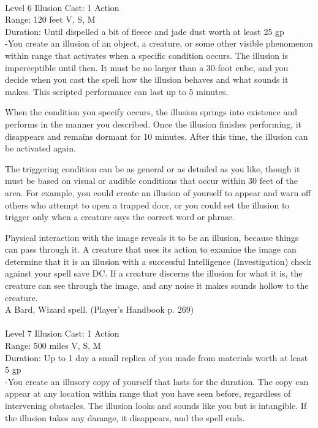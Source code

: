 \documentclass[10pt,twocolumn]{report}
\begin{document}
 \\
Level 6 \quad Illusion \quad Cast: 1 Action\\
Range: 120 feet \quad V, S, M\\
Duration: Until dispelled \quad a bit of fleece and jade dust worth at least 25 gp\\
-You create an illusion of an object, a creature, or some other visible phenomenon within range that activates when a specific condition occurs. The illusion is imperceptible until then. It must be no larger than a 30-foot cube, and you decide when you cast the spell how the illusion behaves and what sounds it makes. This scripted performance can last up to 5 minutes.

When the condition you specify occurs, the illusion springs into existence and performs in the manner you described. Once the illusion finishes performing, it disappears and remains dormant for 10 minutes. After this time, the illusion can be activated again.

The triggering condition can be as general or as detailed as you like, though it must be based on visual or audible conditions that occur within 30 feet of the area. For example, you could create an illusion of yourself to appear and warn off others who attempt to open a trapped door, or you could set the illusion to trigger only when a creature says the correct word or phrase.

Physical interaction with the image reveals it to be an illusion, because things can pass through it. A creature that uses its action to examine the image can determine that it is an illusion with a successful Intelligence (Investigation) check against your spell save DC. If a creature discerns the illusion for what it is, the creature can see through the image, and any noise it makes sounds hollow to the creature.\\
A Bard, Wizard spell. (Player's Handbook p. 269) \\


 \\
Level 7 \quad Illusion \quad Cast: 1 Action\\
Range: 500 miles \quad V, S, M\\
Duration: Up to 1 day \quad a small replica of you made from materials worth at least 5 gp\\
-You create an illusory copy of yourself that lasts for the duration.
The copy can appear at any location within range that you have seen before, regardless of intervening obstacles. The illusion looks and sounds like you but is intangible. If the illusion takes any damage, it disappears, and the spell ends.
\end{document}
